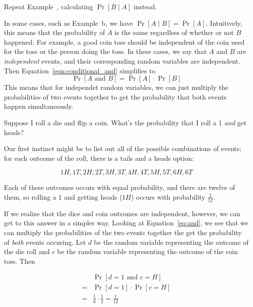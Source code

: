 \begin{exercise}
    \color{blue} %
    Repeat Example~, calculating $\Pr[B \mid A]$ instead.
\end{exercise}

In some cases, such as Example~b, we have $\Pr[A \mid 
B]=\Pr[A]$. Intuitively, this means 
that the probability of $A$ is the same regardless of whether or not $B$
happened. For example, a good coin toss should be independent of the coin 
used for the toss or the person doing the toss.
In these cases, we say that $A$ and $B$ are \emph{independent} events, and 
their corresponding random variables are independent. Then Equation~\ref{eqn:conditional_and}
simplifies to 
\begin{equation}\label{eq:and}
   \Pr[A \text{ and } B] = \Pr[A] \cdot \Pr[B]
\end{equation}
This means that for independet random variables, we can just multiply the probabilities 
of two events together to get the probability that both events happen simultaneously.

\begin{example}
    Suppose I roll a die and flip a coin. What's the probability that I roll a 1 
    \emph{and} get heads?

    Our first instinct might be to list out all of the possible 
    combinations of events; for each outcome of the roll, there is a tails and a 
    heads option:

    \[
        1H, 1T, 2H, 2T, 3H, 3T, 4H, 4T, 5H, 5T, 6H, 6T
    \]

    Each of these outcomes occurs with equal probability, and there 
    are twelve of them, so rolling a 1 and getting heads ($1H$) occurs 
    with probability $\frac{1}{12}$.

    If we realize that the dice and coin outcomes are independent, however,
    we can get to this answer in a simpler way. Looking at Equation~\ref{eq:and}, 
    we see that we can multiply the probabilities of the two events together
    the get the probability of \emph{both} events occuring. Let 
    $d$ be the random variable representing the outcome of the die roll and $c$ 
    be the random variable representing the outcome of the coin toss. Then 

    \begin{align*}
        &\Pr[d=1 \text{ and } c=H]\\
        =& \Pr[d=1] \cdot \Pr[c=H]\\
        =& \frac{1}{6} \cdot \frac{1}{2} = \frac{1}{12}
    \end{align*}
\end{example}

